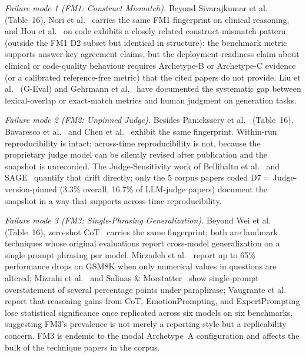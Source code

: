 \documentclass[acmsmall, nonacm, screen]{acmart}
\begin{document}
\textit{Failure mode 1 (FM1: Construct Mismatch).} Beyond
Sivarajkumar et al.~\cite{sivarajkumar2024empirical} (Table~16),
Nori et al.~\cite{nori2023gpt4medical} carries the same FM1
fingerprint on clinical reasoning, and Hou et
al.~\cite{advancedllmsse2024} on code exhibits a closely related
construct-mismatch pattern (outside the FM1 D2 subset but identical
in structure): the benchmark metric supports answer-key agreement
claims, but the deployment-readiness claim about clinical or
code-quality behaviour requires Archetype-B or Archetype-C evidence
(or a calibrated reference-free metric) that the cited papers do
not provide. Liu et
al.~\cite{liu2023geval} (G-Eval) and Gehrmann et
al.~\cite{repairing2022} have documented the systematic gap between
lexical-overlap or exact-match metrics and human judgment on
generation tasks.

\textit{Failure mode 2 (FM2: Unpinned Judge).} Besides Panickssery
et al.~\cite{judgingjudges2024} (Table~16), Bavaresco et
al.~\cite{llmvshuman2024} and Chen et al.~\cite{multiagentjudge2025}
exhibit the same fingerprint. Within-run reproducibility is intact;
across-time reproducibility is not, because the proprietary judge
model can be silently revised after publication and the snapshot is
unrecorded. The Judge-Sensitivity work of Bellibaltu et
al.~\cite{bellibatlu2026judgesense} and SAGE~\cite{feng2025sage}
quantify that drift directly; only the 5 corpus papers coded D7 =
Judge-version-pinned (3.3\% overall, 16.7\% of LLM-judge papers)
document the snapshot in a way that supports across-time
reproducibility.

\textit{Failure mode 3 (FM3: Single-Phrasing Generalization).}
Beyond Wei et al.~\cite{wei2022chain} (Table~16), zero-shot
CoT~\cite{kojima2022large} carries the same fingerprint; both are
landmark techniques whose original evaluations report cross-model
generalization on a single prompt phrasing per model. Mirzadeh et
al.~\cite{mirzadeh2024gsmsymbolic} report up to 65\% performance
drops on GSM8K when only numerical values in questions are altered;
Mizrahi et al.~\cite{mizrahi2024state} and Salinas \&
Morstatter~\cite{butterfly2024} show single-prompt overstatement of
several percentage points under paraphrase; Vaugrante et
al.~\cite{vaugrante2024replication} report that reasoning gains from
CoT, EmotionPrompting, and ExpertPrompting lose statistical
significance once replicated across six models on six benchmarks,
suggesting FM3's prevalence is not merely a reporting style but a
replicability concern. FM3 is endemic to the modal Archetype~A
configuration and affects the bulk of the technique papers in the
corpus.
\end{document}
